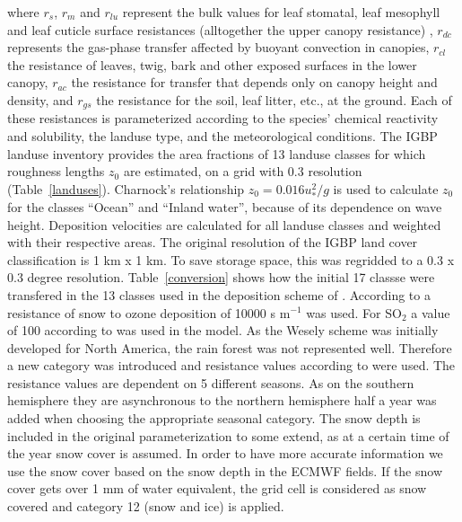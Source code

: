 \documentclass{egu}                  %
\begin{document}
where $r_s$, $r_m$ and $r_{lu}$ represent the bulk values for leaf stomatal,
leaf mesophyll and leaf cuticle surface resistances (alltogether the upper
canopy resistance) , $r_{dc}$ represents the gas-phase transfer affected by
buoyant convection in canopies, $r_{cl}$ the resistance of leaves, twig, bark
and other exposed surfaces in the lower canopy, $r_{ac}$ the resistance for
transfer that depends only on canopy height and density, and $r_{gs}$ the
resistance for the soil, leaf litter, etc., at the ground.  Each of these
resistances is parameterized according to the species' chemical reactivity and
solubility, the landuse type, and the meteorological conditions.  The IGBP
landuse inventory \citep{belward1999} provides the area fractions of 13 landuse
classes for which roughness lengths $z_0$ are estimated, on a grid with 0.3
resolution (Table~\ref{landuses}).  Charnock's relationship \citep{stull1988}
$z_0=0.016u_*^2/g$ is used to calculate $z_0$ for the classes ``Ocean'' and
``Inland water'', because of its dependence on wave height.  Deposition
velocities are calculated for all landuse classes and weighted with their
respective areas.  The original resolution of the IGBP land cover
classification is 1 km x 1 km.  To save storage space, this was regridded to a
0.3 x 0.3 degree resolution.  Table~\ref{conversion} shows how the initial 17
classse were transfered in the 13 classes used in the deposition scheme of
\cite{wesely1989}.  According to \cite{helmig2007} a resistance of snow to
ozone deposition of 10000 s m$^{-1}$ was used.  For SO$_2$ a value of 100
according to \citet{zhang2002} was used in the model.  As the Wesely scheme was
initially developed for North America, the rain forest was not represented
well.  Therefore a new category was introduced and resistance values according
to \cite{jacob1990} were used.  The resistance values are dependent on 5
different seasons.  As on the southern hemisphere they are asynchronous to the
northern hemisphere half a year was added when choosing the appropriate
seasonal category.  The snow depth is included in the original
\cite{wesely1989} parameterization to some extend, as at a certain time of the
year snow cover is assumed.  In order to have more accurate information we use
the snow cover based on the snow depth in the ECMWF fields.  If the snow cover
gets over 1 mm of water equivalent, the grid cell is considered as snow covered
and category 12 (snow and ice) is applied.
\end{document}
